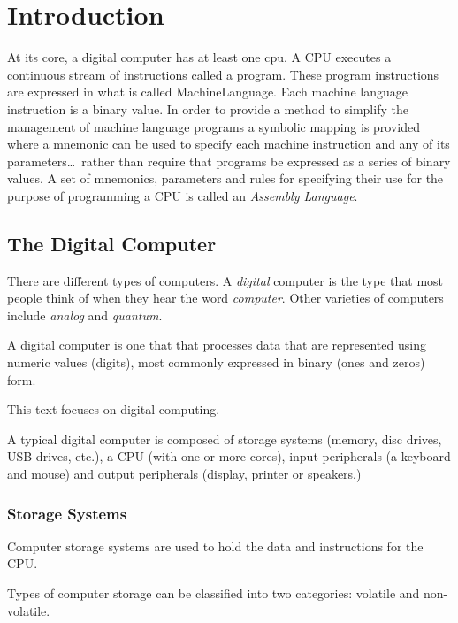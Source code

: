 \chapter{Introduction}
\label{chapter:Introduction}

At its core, a digital computer has at least one \acrfull{cpu}.  A
CPU executes a continuous stream of instructions called a \gls{program}.  
These program instructions are expressed in what is called 
\gls{MachineLanguage}.  Each machine language instruction is a \gls{binary} value.  
In order to provide a method to simplify the management of machine language 
programs a symbolic mapping is provided where a \gls{mnemonic} can be used to 
specify each machine instruction and any of its parameters\ldots\ rather 
than require that programs be expressed as a series of binary values.  
A set of mnemonics, parameters and rules for specifying their use for
the purpose of programming a CPU is called an {\em Assembly Language}.

\section{The Digital Computer}

There are different types of computers.  A {\em digital} computer is
the type that most people think of when they hear the word {\em computer}.
Other varieties of computers include {\em analog} and {\em quantum}.

A digital computer is one that that processes data that are represented
using numeric values (digits), most commonly expressed in binary
(ones and zeros) form.

This text focuses on digital computing.

A typical digital computer is composed of storage systems (memory, disc 
drives, USB drives, etc.), a CPU (with one or more cores), input peripherals 
(a keyboard and mouse) and output peripherals (display, printer or speakers.)

\subsection{Storage Systems}

Computer storage systems are used to hold the data and instructions
for the CPU.

Types of computer storage can be classified into two categories:
volatile and non-volatile.

